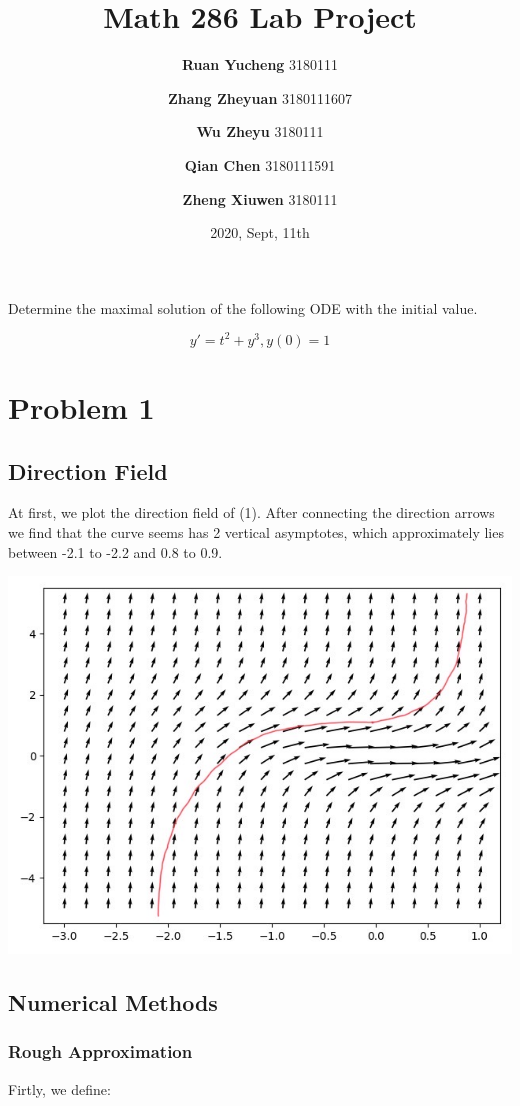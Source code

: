 \documentclass[cap,cs5size,nospace,indent,fancyhdr]{ctexart}
\title{Math 286 Lab Project}
\date{2020, Sept, 11th}
\author{\textbf{Ruan Yucheng} 3180111}
\author{\textbf{Zhang Zheyuan} 3180111607}
\author{\textbf{Wu Zheyu} 3180111}
\author{\textbf{Qian Chen} 3180111591}
\author{\textbf{Zheng Xiuwen} 3180111}
\affil{Department of Mechanical Engineering, ZJUI}
\begin{document}
\maketitle

Determine the maximal solution of the following ODE with the initial value.

\begin{equation}
	y' = t^2+y^3, y(0)=1
\end{equation}

\section{Problem 1}
\subsection{Direction Field}
At first, we plot the direction field of (1). After connecting the direction arrows we find that the curve seems has 2 vertical asymptotes, which approximately lies between -2.1 to -2.2 and 0.8 to 0.9.

\begin{center}
	\includegraphics[scale=0.3]{HandSketch.jpeg}
\end{center}

\subsection{Numerical Methods}

\subsubsection{Rough Approximation}
Firtly, we define: 
\end{document}
